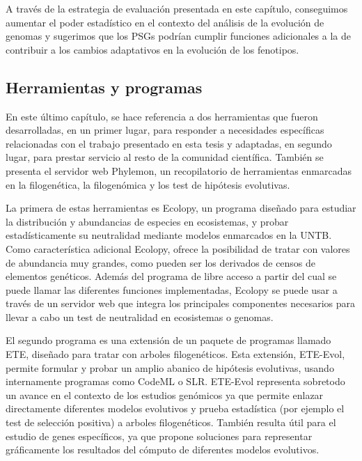 A través de la estrategia de evaluación presentada en este capítulo, conseguimos aumentar el poder estadístico en el contexto del análisis de la evolución de genomas y sugerimos que los PSGs podrían cumplir funciones adicionales a la de contribuir a los cambios adaptativos en la evolución de los fenotipos.


\subsection*{Herramientas y programas}

En este último capítulo, se hace referencia a dos herramientas que fueron desarrolladas, en un primer lugar, para responder a necesidades específicas relacionadas con el trabajo presentado en esta tesis y adaptadas, en segundo lugar, para prestar servicio al resto de la comunidad científica. También se presenta el servidor web Phylemon, un recopilatorio de herramientas enmarcadas en la filogenética, la filogenómica y los test de hipótesis evolutivas.

La primera de estas herramientas es Ecolopy, un programa diseñado para estudiar la distribución y abundancias de especies en ecosistemas, y probar estadísticamente su neutralidad mediante modelos enmarcados en la UNTB. Como característica adicional Ecolopy, ofrece la posibilidad de tratar con valores de abundancia muy grandes, como pueden ser los derivados de censos de elementos genéticos. Además del programa de libre acceso a partir del cual se puede llamar las diferentes funciones implementadas, Ecolopy se puede usar a través de un servidor web que integra los principales componentes necesarios para llevar a cabo un test de neutralidad en ecosistemas o genomas.

El segundo programa es una extensión de un paquete de programas llamado ETE, diseñado para tratar con arboles filogenéticos. Esta extensión, ETE-Evol, permite formular y probar un amplio abanico de hipótesis evolutivas, usando internamente programas como CodeML o SLR. ETE-Evol representa sobretodo un avance en el contexto de los estudios genómicos ya que permite enlazar directamente diferentes modelos evolutivos y prueba estadística (por ejemplo el test de selección positiva) a arboles filogenéticos. También resulta útil para el estudio de genes específicos, ya que propone soluciones para representar gráficamente los resultados del cómputo de diferentes modelos evolutivos.

